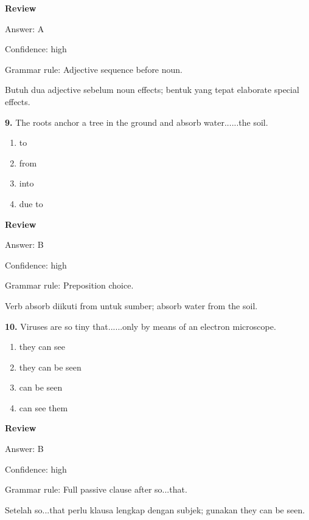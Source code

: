 \documentclass[12pt]{article}
\begin{document}
\par
\begingroup
\setlength{\parskip}{0pt}
\setlength{\parindent}{0pt}
\textbf{Review}\par
Answer: A\par
Confidence: high\par
Grammar rule: Adjective sequence before noun.\par
Butuh dua adjective sebelum noun effects; bentuk yang tepat elaborate special effects.\par
\endgroup
\par
\vspace{0.25\baselineskip}
\noindent\textbf{9.} The roots anchor a tree in the ground and absorb water......the soil.
\begin{enumerate}[label=(\Alph*),leftmargin=*,itemsep=0.2em]
\item to
\item from
\item into
\item due to
\end{enumerate}
\par
\begingroup
\setlength{\parskip}{0pt}
\setlength{\parindent}{0pt}
\textbf{Review}\par
Answer: B\par
Confidence: high\par
Grammar rule: Preposition choice.\par
Verb absorb diikuti from untuk sumber; absorb water from the soil.\par
\endgroup
\par
\vspace{0.25\baselineskip}
\noindent\textbf{10.} Viruses are so tiny that......only by means of an electron microscope.
\begin{enumerate}[label=(\Alph*),leftmargin=*,itemsep=0.2em]
\item they can see
\item they can be seen
\item can be seen
\item can see them
\end{enumerate}
\par
\begingroup
\setlength{\parskip}{0pt}
\setlength{\parindent}{0pt}
\textbf{Review}\par
Answer: B\par
Confidence: high\par
Grammar rule: Full passive clause after so...that.\par
Setelah so...that perlu klausa lengkap dengan subjek; gunakan they can be seen.\par
\end{document}
